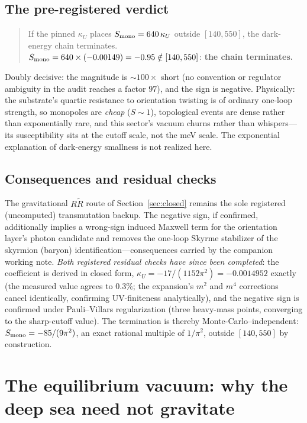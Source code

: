 \documentclass[11pt]{article}
\begin{document}
\subsection{The pre-registered verdict}

\begin{quote}
If the pinned $\kappa_U$ places $S_{\rm mono} = 640\,\kappa_U$ outside
$[140, 550]$, the dark-energy chain terminates.\\[2pt]
$S_{\rm mono} = 640 \times (-0.00149) = -0.95 \notin [140,550]$:
\textbf{the chain terminates.}
\end{quote}
Doubly decisive: the magnitude is $\sim\!100\times$ short (no
convention or regulator ambiguity in the audit reaches a factor
$97$), and the sign is negative.  Physically: the substrate's quartic
resistance to orientation twisting is of ordinary one-loop strength,
so monopoles are \emph{cheap} ($S \sim 1$), topological events are
dense rather than exponentially rare, and this sector's vacuum
churns rather than whispers---its susceptibility sits at the cutoff
scale, not the meV scale.  The exponential explanation of dark-energy
smallness is not realized here.

\subsection{Consequences and residual checks}

The gravitational $R\tilde{R}$ route of Section~\ref{sec:closed}
remains the sole registered (uncomputed) transmutation backup.  The
negative sign, if confirmed, additionally implies a wrong-sign induced
Maxwell term for the orientation layer's photon candidate and removes
the one-loop Skyrme stabilizer of the skyrmion (baryon)
identification---consequences carried by the companion working note.
\emph{Both registered residual checks have since been completed}:
the coefficient is derived in closed form,
$\kappa_U = -17/(1152\pi^2) = -0.0014952$ exactly (the measured
value agrees to $0.3\%$; the expansion's $m^2$ and $m^4$ corrections
cancel identically, confirming UV-finiteness analytically), and the
negative sign is confirmed under Pauli--Villars regularization
(three heavy-mass points, converging to the sharp-cutoff value).
The termination is thereby Monte-Carlo--independent:
$S_{\rm mono} = -85/(9\pi^2)$, an exact rational multiple of
$1/\pi^2$, outside $[140,550]$ by construction.

\section{The equilibrium vacuum: why the deep sea need not gravitate}
\label{sec:volovik}
\end{document}
